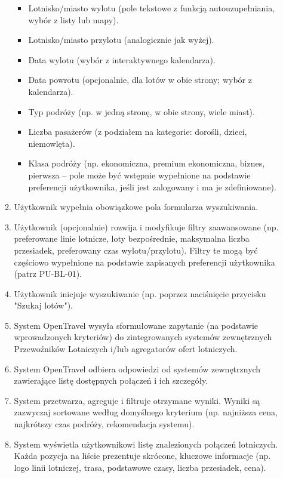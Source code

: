 \documentclass[a4paper,12pt]{article}
\begin{document}
\begin{itemize}
\begin{enumerate}
                \begin{itemize}
                    \item Lotnisko/miasto wylotu (pole tekstowe z funkcją autouzupełniania, wybór z listy lub mapy).
                    \item Lotnisko/miasto przylotu (analogicznie jak wyżej).
                    \item Data wylotu (wybór z interaktywnego kalendarza).
                    \item Data powrotu (opcjonalnie, dla lotów w obie strony; wybór z kalendarza).
                    \item Typ podróży (np. w jedną stronę, w obie strony, wiele miast).
                    \item Liczba pasażerów (z podziałem na kategorie: dorośli, dzieci, niemowlęta).
                    \item Klasa podróży (np. ekonomiczna, premium ekonomiczna, biznes, pierwsza – pole może być wstępnie wypełnione na podstawie preferencji użytkownika, jeśli jest zalogowany i ma je zdefiniowane).
                \end{itemize}
            \item Użytkownik wypełnia obowiązkowe pola formularza wyszukiwania.
            \item Użytkownik (opcjonalnie) rozwija i modyfikuje filtry zaawansowane (np. preferowane linie lotnicze, loty bezpośrednie, maksymalna liczba przesiadek, preferowany czas wylotu/przylotu). Filtry te mogą być częściowo wypełnione na podstawie zapisanych preferencji użytkownika (patrz PU-BL-01).
            \item Użytkownik inicjuje wyszukiwanie (np. poprzez naciśnięcie przycisku "Szukaj lotów").
            \item System OpenTravel wysyła sformułowane zapytanie (na podstawie wprowadzonych kryteriów) do zintegrowanych systemów zewnętrznych Przewoźników Lotniczych i/lub agregatorów ofert lotniczych.
            \item System OpenTravel odbiera odpowiedzi od systemów zewnętrznych zawierające listę dostępnych połączeń i ich szczegóły.
            \item System przetwarza, agreguje i filtruje otrzymane wyniki. Wyniki są zazwyczaj sortowane według domyślnego kryterium (np. najniższa cena, najkrótszy czas podróży, rekomendacja systemu).
            \item System wyświetla użytkownikowi listę znalezionych połączeń lotniczych. Każda pozycja na liście prezentuje skrócone, kluczowe informacje (np. logo linii lotniczej, trasa, podstawowe czasy, liczba przesiadek, cena).

\end{enumerate}
\end{itemize}
\end{document}
